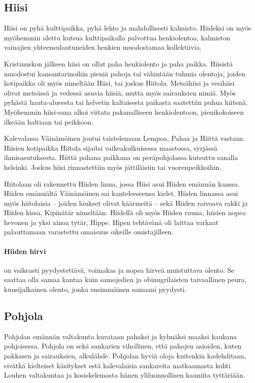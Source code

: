 \subsection{Hiisi}

  Hiisi on pyhä kulttipaikka, pyhä lehto ja mahdollisesti kalmisto. Hiideksi on myös myöhemmin alettu 
  kutsua kulttipaikalla palvottua henkiolentoa, kalmiston vainajien yhteensulautuneiden henkien 
  muodostamaa kollektiivia. \par Kristinuskon jälkeen hiisi on ollut paha henkiolento ja paha paikka. 
  Hiisistä muodostui kansantarinoihin pieniä pahoja tai vähintään tuhmia olentoja, joiden 
  kotipaikka oli myös nimeltään Hiisi, tai joskus Hiitola. Metsähiisi ja vesihiisi olivat 
  metsässä ja vedessä asuvia hiisiä, mutta myös sairauksien nimiä. Myös pyhästä hauta-alueesta 
  tai helvetin kaltaisesta paikasta saatettiin puhua hiitenä. Myöhemmin hiisi-sana alkoi viitata 
  pakanalliseen henkiolentoon, pienikokoiseen ilkeään haltiaan tai peikkoon. \par Kalevalassa 
  Väinämöinen joutui taistelemaan Lempoa, Pahaa ja Hiittä vastaan. Hiisien kotipaikka Hiitola 
  sijaitsi vaikeakulkuisessa maastossa, syrjässä ihmisasutuksesta. Hiittä pahana paikkana on 
  peräpohjolassa kutsuttu sanalla helsinki. Joskus hiisi rinnastettiin myös jättiläisiin tai 
  vuorenpeikkoihin. \par Hiitolaan oli rakennettu Hiiden linna, jossa Hiisi asui Hiiden emännän 
  kanssa. Hiiden emännältä Väinämöinen sai kanteleeseensa kielet. Hiiden linnassa asui myös 
  hiitolaisia -- joiden hiukset olivat käärmeitä -- sekä Hiiden raivoava rakki ja Hiiden kissa, 
  Kipinätär nimeltään. Hiidellä oli myös Hiiden ruuna, hiisien nopea hevonen ja yksi ainoa 
  tytär, Hippe. Hipen tehtävänä oli laittaa varkaat palauttamaan varastettu omaisuus oikeille 
  omistajilleen. 
  
  \paragraph{Hiiden hirvi} on vaikeasti pyydystettävä, voimakas ja nopea hirveä muistuttava olento.
    Se saattaa olla samaa kantaa kuin samojedien ja obinugrilaisten taivaallinen peura, kuusijalkainen olento,
    jonka ensimmäinen samaani pyydysti. 


\subsection{Pohjola}
  Pohjolan emännän valtakunta kuvataan pahaksi ja kylmäksi maaksi kaukana pohjoisessa. Pohjola 
  on sekä sankarien vihollinen, että pahojen asioiden, kuten pakkasen ja sairauksien, alkulähde. 
  Pohjolan hyviä oloja kuitenkin kadehditaan, eivätkä kielteiset käsitykset estä kalevalaisia 
  sankareita matkaamasta kohti Louhen valtakuntaa ja kosiskelemasta hänen yliluonnollisen 
  kauniita tyttäriään.

